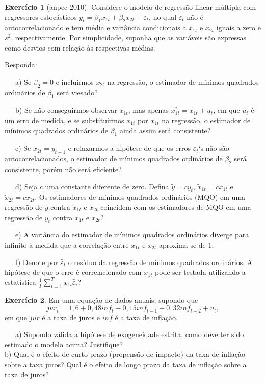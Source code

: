 \documentclass[
]{book}
\theoremstyle{definition}
\theoremstyle{definition}
\theoremstyle{definition}
\newtheorem{exercise}{Exercício}[chapter]
\theoremstyle{remark}
\begin{document}
\begin{exercise}[anpec-2010]
\protect\hypertarget{exr:exsr2}{}{\label{exr:exsr2} {} }Considere o modelo de regressão linear múltipla com regressores estocásticos \(y_t = \beta_1 x_{1t} + \beta_2 x_{2t} + \varepsilon_t\), no qual \(\varepsilon_t\) não é autocorrelacionado e tem média e variância condicionais a \(x_{1t}\) e \(x_{2t}\) iguais a zero e \(s^2\), respectivamente. Por simplicidade, suponha que as variáveis são expressas como desvios com relação às respectivas médias.

Responda:

~~~a) Se \(\beta_2 = 0\) e incluirmos \(x_{2t}\) na regressão, o estimador de mínimos quadrados ordinários de \(\beta_1\) será viesado?

~~~b) Se não conseguirmos observar \(x_{1t}\), mas apenas \(x_{1t}^*=x_{1t}+u_t\), em que \(u_t\) é um erro de medida, e se substituirmos \(x_{1t}\) por \(x_{1t}\) na regressão, o estimador de mínimos quadrados ordinários de \(\beta_1\) ainda assim será consistente?

~~~c) Se \(x_{2t} = y_{t-1}\) e relaxarmos a hipótese de que os erros \(\varepsilon_t\)`s não são autocorrelacionados, o estimador de mínimos quadrados ordinários de \(\beta_2\) será consistente, porém não será eficiente?

~~~d) Seja \(c\) uma constante diferente de zero. Defina \(\tilde{y}= cy_t\), \(\tilde{x}_{1t}= cx_{1t}\) e \(\tilde{x}_{2t} = cx_{2t}\). Os estimadores de mínimos quadrados ordinários (MQO) em uma regressão de \(\tilde{y}\) contra \(\tilde{x}_{1t}\) e \(\tilde{x}_{2t}\) coincidem com os estimadores de MQO em uma regressão de \(y_t\) contra \(x_{1t}\) e \(x_{2t}\)?

~~~e) A variância do estimador de mínimos quadrados ordinários diverge para infinito à medida que a correlação entre \(x_{1t}\) e \(x_{2t}\) aproxima-se de 1;

~~~f) Denote por \(\widehat{\varepsilon}_t\) o resíduo da regressão de mínimos quadrados ordinários. A hipótese de que o erro é correlacionado com \(x_{1t}\) pode ser testada utilizando a estatística \(\frac{1}{T}\sum_{i=1}^{T}x_{1i}\widehat{\varepsilon}_{i}\)?
\end{exercise}

\begin{exercise}
\protect\hypertarget{exr:exsr3}{}{\label{exr:exsr3} }Em uma equação de dados anuais, supondo que
\[jur_t=1,6+0,48inf_t-0,15inf_{t-1}+0,32inf_{t-2}+u_t,\]
em que \(jur\) é a taxa de juros e \(inf\) é a taxa de inflação.

~~~a) Supondo válida a hipótese de exogeneidade estrita, como deve ter sido estimado o modelo acima? Justifique?\\
\hspace*{0.333em}\hspace*{0.333em}\hspace*{0.333em}b) Qual é o efeito de curto prazo (propensão de impacto) da taxa de inflação sobre a taxa juros? Qual é o efeito de longo prazo da taxa de inflação sobre a taxa de juros?
\end{exercise}
\end{document}
